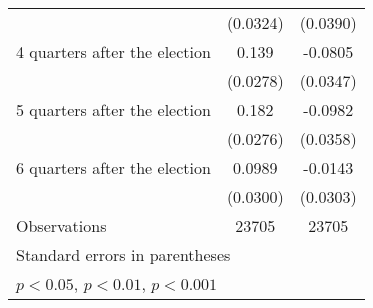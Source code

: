 \begin{table}[htbp]
\begin{tabular}{l*{2}{c}}
                    &    (0.0324)         &    (0.0390)         \\
[1em]
 4 quarters after the election&       0.139\sym{***}&     -0.0805\sym{*}  \\
                    &    (0.0278)         &    (0.0347)         \\
[1em]
 5 quarters after the election&       0.182\sym{***}&     -0.0982\sym{**} \\
                    &    (0.0276)         &    (0.0358)         \\
[1em]
 6 quarters after the election&      0.0989\sym{***}&     -0.0143         \\
                    &    (0.0300)         &    (0.0303)         \\
\hline
Observations        &       23705         &       23705         \\
\hline\hline
\multicolumn{3}{l}{\footnotesize Standard errors in parentheses}\\
\multicolumn{3}{l}{\footnotesize \sym{*} \(p<0.05\), \sym{**} \(p<0.01\), \sym{***} \(p<0.001\)}\\
\end{tabular}
\end{table}
